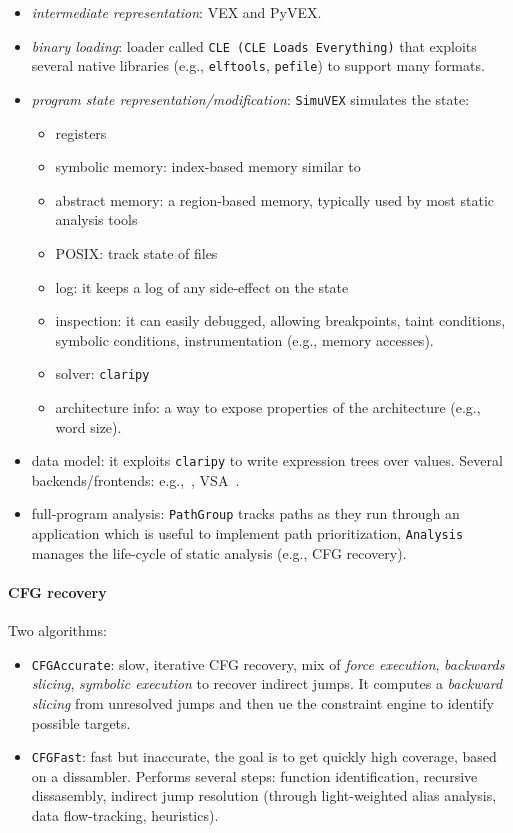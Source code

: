 \begin{itemize}
  \item {\em intermediate representation}: VEX and PyVEX.
  \item {\em binary loading}: loader called {\tt CLE (CLE Loads Everything)} that exploits several native libraries (e.g., {\tt elftools}, {\tt pefile}) to support many formats.
  \item {\em program state representation/modification}: {\tt SimuVEX} simulates the state:
    \begin{itemize}
      \item registers
      \item symbolic memory: index-based memory similar to~\cite{MAYHEM-SP12}
      \item abstract memory: a region-based memory, typically used by most static analysis tools
      \item POSIX: track state of files
      \item log: it keeps a log of any side-effect on the state
      \item inspection: it can easily debugged, allowing breakpoints, taint conditions, symbolic conditions, instrumentation (e.g., memory accesses).
      \item solver: {\tt claripy}
      \item architecture info: a way to expose properties of the architecture (e.g., word size).
    \end{itemize}  
  \item data model: it exploits {\tt claripy} to write expression trees over values. Several backends/frontends: e.g.,~\cite{Z3-TACS08}, VSA~\cite{WYSINWYX-TOPLAS10}.
  \item full-program analysis: {\tt PathGroup} tracks paths as they run through an application which is useful to implement path prioritization, {\tt Analysis} manages the life-cycle of static analysis (e.g., CFG recovery).
\end{itemize}

\paragraph{CFG recovery} Two algorithms:
\begin{itemize}
  \item {\tt CFGAccurate}: slow, iterative CFG recovery, mix of {\em force execution}, {\em backwards slicing}, {\em symbolic execution} to recover indirect jumps. It computes a {\em backward slicing} from unresolved jumps and then ue the constraint engine to identify possible targets.
  \item {\tt CFGFast}: fast but inaccurate, the goal is to get quickly high coverage, based on a dissambler. Performs several steps: function identification,  recursive dissasembly, indirect jump resolution (through light-weighted alias analysis, data flow-tracking, heuristics).
\end{itemize}

